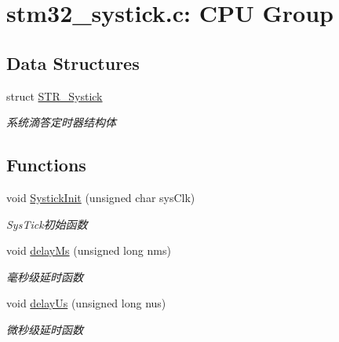 \hypertarget{group___systick}{\section{stm32\-\_\-systick.\-c\-: \-C\-P\-U \-Group}
\label{group___systick}
}
\subsection*{\-Data \-Structures}
\begin{DoxyCompactItemize}
\item 
struct \hyperlink{struct_s_t_r___systick}{\-S\-T\-R\-\_\-\-Systick}
\begin{DoxyCompactList}\small\item\em 系统滴答定时器结构体 \end{DoxyCompactList}\end{DoxyCompactItemize}
\subsection*{\-Functions}
\begin{DoxyCompactItemize}
\item 
void \hyperlink{group___systick_ga6a4dda3916b88b3f9865a6139918cd51}{\-Systick\-Init} (unsigned char sys\-Clk)
\begin{DoxyCompactList}\small\item\em \-Sys\-Tick初始函数 \end{DoxyCompactList}\item 
void \hyperlink{group___systick_ga123f135e69ea11715b56e407cd33cde1}{delay\-Ms} (unsigned long nms)
\begin{DoxyCompactList}\small\item\em 毫秒级延时函数 \end{DoxyCompactList}\item 
void \hyperlink{group___systick_ga4a8afb6879fabf019480205f103a09e2}{delay\-Us} (unsigned long nus)
\begin{DoxyCompactList}\small\item\em 微秒级延时函数 \end{DoxyCompactList}\end{DoxyCompactItemize}
